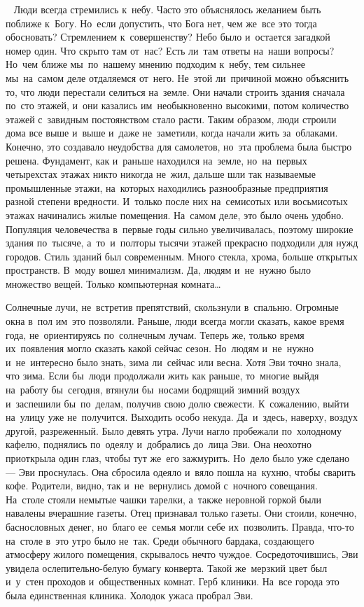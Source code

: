~
Люди всегда стремились к~небу.
Часто это объяснялось желанием быть поближе к~Богу.
Но~если допустить, что Бога нет, чем же~все это тогда обосновать? Стремлением к~совершенству? Небо было и~остается загадкой номер один.
Что скрыто там от~нас? Есть ли~там ответы на~наши вопросы? Но~чем ближе мы~по~нашему мнению подходим к~небу, тем сильнее мы~на~самом деле отдаляемся от~него.
Не~этой ли~причиной можно объяснить то, что люди перестали селиться на~земле.
Они начали строить здания сначала по~сто этажей, и~они казались им~необыкновенно высокими, потом количество этажей с~завидным постоянством стало расти.
Таким образом, люди строили дома все выше и~выше и~даже не~заметили, когда начали жить за~облаками.
Конечно, это создавало неудобства для самолетов, но~эта проблема была быстро решена.
Фундамент, как и~раньше находился на~земле, но~на~первых четырехстах этажах никто никогда не~жил, дальше шли так называемые промышленные этажи, на~которых находились разнообразные предприятия разной степени вредности.
И~только после них на~семисотых или восьмисотых этажах начинались жилые помещения.
На~самом деле, это было очень удобно.
Популяция человечества в~первые годы сильно увеличивалась, поэтому широкие здания по~тысяче, а~то~и~полторы тысячи этажей прекрасно подходили для нужд городов.
Стиль зданий был современным.
Много стекла, хрома, больше открытых пространств.
В~моду вошел минимализм.
Да, людям и~не~нужно было множество вещей.
Только компьютерная комната…
 
Солнечные лучи, не~встретив препятствий, скользнули в~спальню.
Огромные окна в~пол им~это позволяли.
Раньше, люди всегда могли сказать, какое время года, не~ориентируясь по~солнечным лучам.
Теперь же, только время их~появления могло сказать какой сейчас сезон.
Но~людям и~не~нужно и~не~интересно было знать, зима ли~сейчас или весна.
Хотя Эви точно знала, что зима.
Если бы~люди продолжали жить как раньше, то~многие выйдя на~работу бы~сегодня, втянули бы~носами бодрящий зимний воздух и~заспешили бы~по~делам, получив свою долю свежести.
К~сожалению, выйти на~улицу уже не~получится.
Выходить особо некуда.
Да~и~здесь, наверху, воздух другой, разреженный.
Было девять утра.
Лучи нагло пробежали по~холодному кафелю, поднялись по~одеялу и~добрались до~лица Эви.
Она неохотно приоткрыла один глаз, чтобы тут же~его зажмурить.
Но~дело было уже сделано --- Эви проснулась.
Она сбросила одеяло и~вяло пошла на~кухню, чтобы сварить кофе.
Родители, видно, так и~не~вернулись домой с~ночного совещания.
На~столе стояли немытые чашки тарелки, а~также неровной горкой были навалены вчерашние газеты.
Отец признавал только газеты.
Они стоили, конечно, баснословных денег, но~благо ее~семья могли себе их~позволить.
Правда, что-то на~столе в~это утро было не~так.
Среди обычного бардака, создающего атмосферу жилого помещения, скрывалось нечто чуждое.
Сосредоточившись, Эви увидела ослепительно-белую бумагу конверта.
Такой же~мерзкий цвет был и~у~стен проходов и~общественных комнат.
Герб клиники.
На~все города это была единственная клиника.
Холодок ужаса пробрал Эви.
 
